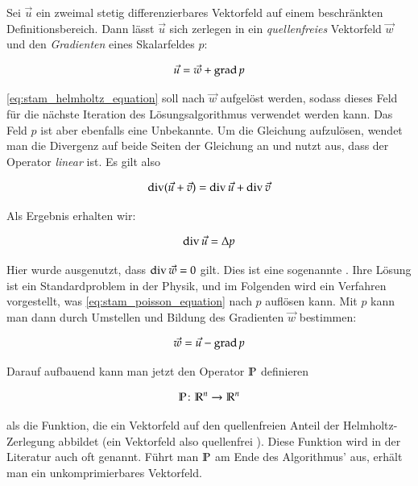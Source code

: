 \begin{PimiddySatz}
Sei $\vec{u}$ ein zweimal stetig differenzierbares Vektorfeld auf einem
beschränkten Definitionsbereich. Dann lässt $\vec{u}$ sich zerlegen in
ein \emph{quellenfreies} Vektorfeld $\vec{w}$ und den \emph{Gradienten}
eines Skalarfeldes $p$:

\begin{equation}
\label{eq:stam_helmholtz_equation}
\vec{u} = \vec{w} + \operatorname*{grad} p
\end{equation}
\end{PimiddySatz}

\autoref{eq:stam_helmholtz_equation} soll nach $\vec{w}$ aufgelöst werden, sodass
dieses Feld für die nächste Iteration des Lösungsalgorithmus verwendet werden
kann. Das Feld $p$ ist aber ebenfalls eine Unbekannte. Um die Gleichung
aufzulösen, wendet man die Divergenz auf beide Seiten der Gleichung an und nutzt
aus, dass der Operator \emph{linear} ist. Es gilt also

\begin{equation}
\operatorname*{div} (\vec{u} + \vec{v}) = \operatorname*{div} \vec{u} + \operatorname*{div} \vec{v}
\end{equation}

Als Ergebnis erhalten wir:

\begin{equation}
\label{eq:stam_poisson_equation}
\operatorname*{div} \vec{u} = \Delta p
\end{equation}

Hier wurde ausgenutzt, dass $\operatorname*{div} \vec{w} = 0$ gilt. Dies ist eine
sogenannte . Ihre Lösung ist ein
Standardproblem in der Physik, und im Folgenden wird ein Verfahren vorgestellt,
was \autoref{eq:stam_poisson_equation} nach $p$ auflösen kann. Mit $p$ kann man
dann durch Umstellen und Bildung des Gradienten $\vec{w}$ bestimmen:

\begin{equation}
\vec{w} = \vec{u} - \operatorname*{grad} p
\end{equation}

Darauf aufbauend kann man jetzt den Operator $\mathbb{P}$ definieren

\begin{equation}
\mathbb{P} \colon \mathbb{R}^n \to \mathbb{R}^n
\end{equation}

als die Funktion, die ein Vektorfeld auf den quellenfreien Anteil der
Helmholtz-Zerlegung abbildet (ein Vektorfeld also quellenfrei
). Diese Funktion wird in der Literatur auch oft
 genannt. Führt man $\mathbb{P}$ am Ende des
Algorithmus' aus, erhält man ein unkomprimierbares Vektorfeld.

